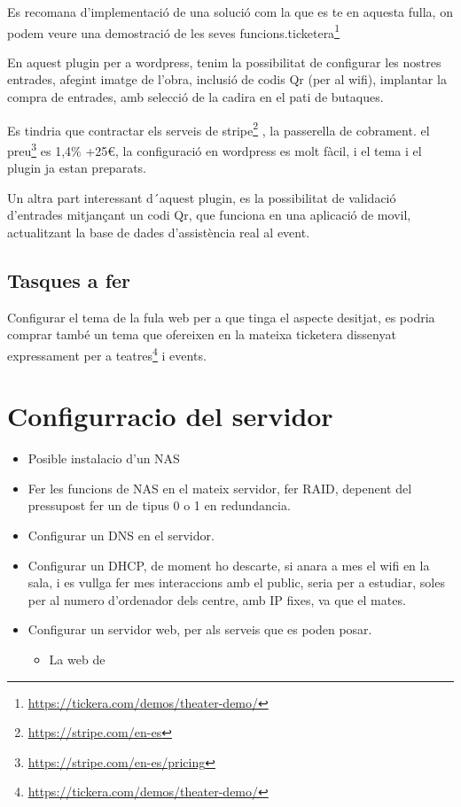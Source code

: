 \documentclass[
  10pt,
]{book}
\DeclareRobustCommand{\href}[2]{#2\footnote{\url{#1}}}
\providecommand{\tightlist}{%
  \setlength{\itemsep}{0pt}\setlength{\parskip}{0pt}}
\begin{document}
Es recomana d'implementació de una solució com la que es te en aquesta fulla, on podem veure una demostració de les seves funcions.\href{https://tickera.com/demos/theater-demo/}{ticketera}

En aquest plugin per a wordpress, tenim la possibilitat de configurar les nostres entrades, afegint imatge de l'obra, inclusió de codis Qr (per al wifi), implantar la compra de entrades, amb selecció de la cadira en el pati de butaques.

Es tindria que contractar els serveis de \href{https://stripe.com/en-es}{stripe} , la passerella de cobrament. el \href{https://stripe.com/en-es/pricing}{preu} es 1,4\% +25€, la configuració en wordpress es molt fàcil, i el tema i el plugin ja estan preparats.

Un altra part interessant d´aquest plugin, es la possibilitat de validació d'entrades mitjançant un codi Qr, que funciona en una aplicació de movil, actualitzant la base de dades d'assistència real al event.

\hypertarget{tasques-a-fer}{%
\section{Tasques a fer}\label{tasques-a-fer}}

Configurar el tema de la fula web per a que tinga el aspecte desitjat, es podria comprar també un tema que ofereixen en la mateixa ticketera dissenyat expressament per a \href{https://tickera.com/demos/theater-demo/}{teatres} i events.

\hypertarget{configurracio-del-servidor}{%
\chapter{Configurracio del servidor}\label{configurracio-del-servidor}}

\begin{itemize}
\item
  Posible instalacio d'un NAS
\item
  Fer les funcions de NAS en el mateix servidor, fer RAID, depenent del pressupost fer un de tipus 0 o 1 en redundancia.
\item
  Configurar un DNS en el servidor.
\item
  Configurar un DHCP, de moment ho descarte, si anara a mes el wifi en la sala, i es vullga fer mes interaccions amb el public, seria per a estudiar, soles per al numero d'ordenador dels centre, amb IP fixes, va que el mates.
\item
  Configurar un servidor web, per als serveis que es poden posar.

  \begin{itemize}
  \tightlist
  \item
    La web de
  \end{itemize}
\end{itemize}

  
\end{document}
